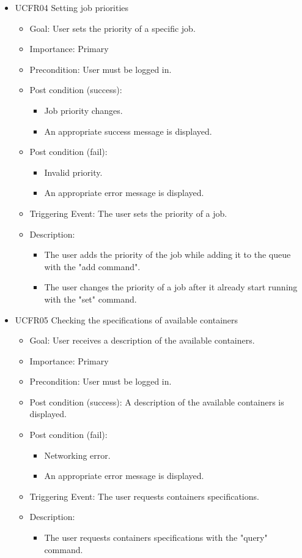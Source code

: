 \begin{itemize}
  \item UCFR04 Setting job priorities
    \begin{itemize}
      \item Goal: User sets the priority of a specific job.
      \item Importance: Primary
      \item Precondition: User must be logged in.
      \item Post condition (success):
        \begin{itemize}
          \item Job priority changes.
          \item An appropriate success message is displayed.
        \end{itemize}
      \item Post condition (fail):
        \begin{itemize}
          \item Invalid priority.
          \item An appropriate error message is displayed.
        \end{itemize}
      \item Triggering Event: The user sets the priority of a job.
      \item Description:
        \begin{itemize}
          \item The user adds the priority of the job while adding it to the queue with the "add command".
          \item The user changes the priority of a job after it already start running with the "set" command.
        \end{itemize}
    \end{itemize}


  \item UCFR05 Checking the specifications of available containers
    \begin{itemize}
      \item Goal: User receives a description of the available containers.
      \item Importance: Primary
      \item Precondition: User must be logged in.
      \item Post condition (success): A description of the available containers is displayed.
      \item Post condition (fail):
        \begin{itemize}
          \item Networking error.
          \item An appropriate error message is displayed.
        \end{itemize}
      \item Triggering Event: The user requests containers specifications.
      \item Description:
        \begin{itemize}
          \item The user requests containers specifications with the "query" command.
        \end{itemize}
    \end{itemize}


\end{itemize}

